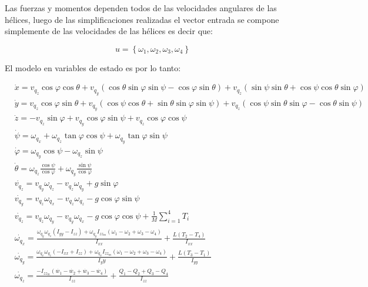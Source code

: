 \documentclass[main]{subfiles}
\begin{document}
Las fuerzas y momentos dependen todos de las velocidades angulares de las h\'elices, luego de las simplificaciones realizadas el vector entrada se compone simplemente de las velocidades de las h\'elices es decir que:

$$u=\left\lbrace\omega_1, \omega_2, \omega_3, \omega_4\right\rbrace$$

El modelo en variables de estado es por lo tanto:

\begin{equation}
\boxed{\begin{aligned}&\dot{x}=v_{q_z} \cos \varphi \cos \theta + v_{q_y} ( \cos \theta \sin \varphi \sin \psi-\cos \varphi \sin \theta ) + v_{q_z}(\sin \psi \sin \theta + \cos \psi \cos \theta \sin \varphi)\\
&\dot{y}=v_{q_z} \cos \varphi \sin \theta + v_{q_y} (\cos \psi \cos \theta + \sin \theta \sin \varphi \sin \psi) + v_{q_z}( \cos \psi \sin \theta \sin \varphi-\cos \theta \sin \psi )\\
&\dot{z}= -v_{q_z} \sin \varphi  + v_{q_y} \cos \varphi \sin \psi  + v_{q_z}\cos \varphi \cos \psi\\
&\dot{\psi}=\omega_{q_x} + \omega_{q_z}\tan\varphi \cos\psi + \omega_{q_y}\tan\varphi \sin\psi\\
&\dot{\varphi}=\omega_{q_y}\cos \psi - \omega_{q_z}\sin\psi\\
&\dot{\theta}=\omega_{q_z} \frac{\cos\psi}{\cos\varphi}  + \omega_{q_y}\frac{\sin\psi}{\cos\varphi}\\
&\dot{v_{q_z}}=v_{q_y} \omega_{q_z} - v_{q_z} \omega_{q_y}+g\sin\varphi\\
&\dot{v_{q_y}}=v_{q_z} \omega_{q_x} - v_{q_z} \omega_{q_z}-g\cos\varphi\sin\psi\\
&\dot{v_{q_z}}=v_{q_z} \omega_{q_y} - v_{q_y} \omega_{q_x}-g\cos\varphi\cos\psi+\frac{1}{M}\sum_{i=1}^4T_i\\
&\dot{\omega_{q_x}}=\frac{\omega_{q_y}\omega_{q_z}(I_{yy}-I_{zz})+\omega_{q_y}I_{zz_m}(\omega_1-\omega_2+\omega_3-\omega_4)}{I_{xx}}+\frac{L(T_2-T_4)}{I_{xx}}\\
&\dot{\omega_{q_y}}=\frac{\omega_{q_x}\omega_{q_z}(-I_{xx}+I_{zz})+\omega_{q_x}I_{zz_m}(\omega_1-\omega_2+\omega_3-\omega_4)}{{I_yy}}+\frac{L(T_3-T_1)}{I_{yy}}\\
&\dot{\omega_{q_z}}=\frac{-I_{zz_m}(\dot{w_1}-\dot{w_2}+\dot{w_3}-\dot{w_4})}{I_{zz}}+\frac{Q_1-Q_2+Q_3-Q_4}{I_{zz}}\\
\end{aligned}}
\end{equation}
\end{document}
